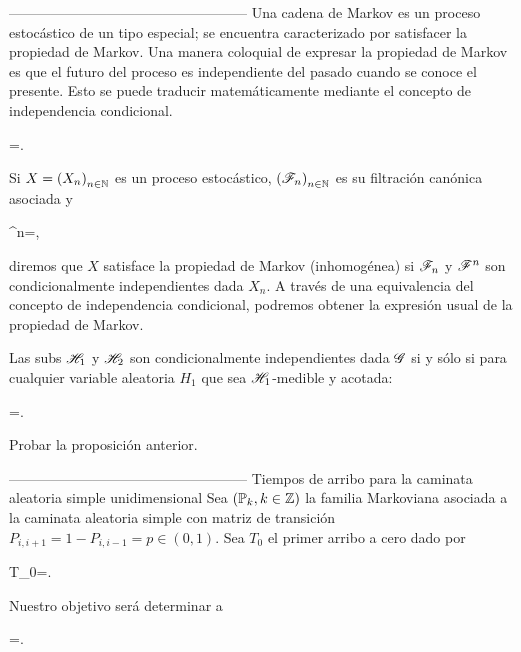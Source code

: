 \pn---------------------------------------------------\pn
Una cadena de Markov es un proceso estoc\'astico de un tipo especial; se encuentra caracterizado por satisfacer la propiedad de Markov. Una manera coloquial de expresar la propiedad de Markov es que el futuro del proceso es independiente del pasado cuando se conoce el presente. Esto se puede traducir matem\'aticamente mediante el concepto de independencia condicional.
\begin{definicion}
\begin{esn}
=.
\end{esn}
\end{definicion}
Si $X=\left( X_n\right) _{n\in\mathbb{N}}$ es un proceso estoc\'astico, $\left( \mathscr{F}_n\right) _{n\in\mathbb{N}}$ es su filtraci\'on can\'onica asociada y\begin{esn}
\F^n=,
\end{esn}diremos que $X$ satisface la propiedad de Markov (inhomog\'enea) si $\mathscr{F}_n$ y $\mathscr{F}^n$ son condicionalmente independientes dada $X_n$. 
A trav\'es de una equivalencia del concepto de independencia condicional, podremos obtener la expresi\'on usual de la propiedad de Markov.
\begin{proposicion}
Las sub\sa s $\mathscr{H}_1$ y $\mathscr{H}_2$ son condicionalmente independientes dada $\mathscr{G}$ si y s\'olo si para cualquier variable aleatoria $H_1$ que sea $\mathscr{H}_1$-medible y acotada:
\begin{esn}
=.
\end{esn}
\end{proposicion}
\begin{ejercicio}
Probar la proposici\'on anterior.
\end{ejercicio}

\pn---------------------------------------------------\pn
Tiempos de arribo para la caminata aleatoria simple unidimensional
Sea $\left(  \mathbb{P} _k,k\in\mathbb{Z}\right) $ la familia Markoviana asociada a la caminata aleatoria simple con matriz de transici\'on $P_{i,i+1}=1-P_{i,i-1}=p\in (0,1)$. Sea $T_0$ el primer arribo a cero dado por\begin{esn}
T_0=\min{}.
\end{esn}Nuestro objetivo ser\'a determinar a\begin{esn}
=.
\end{esn}

